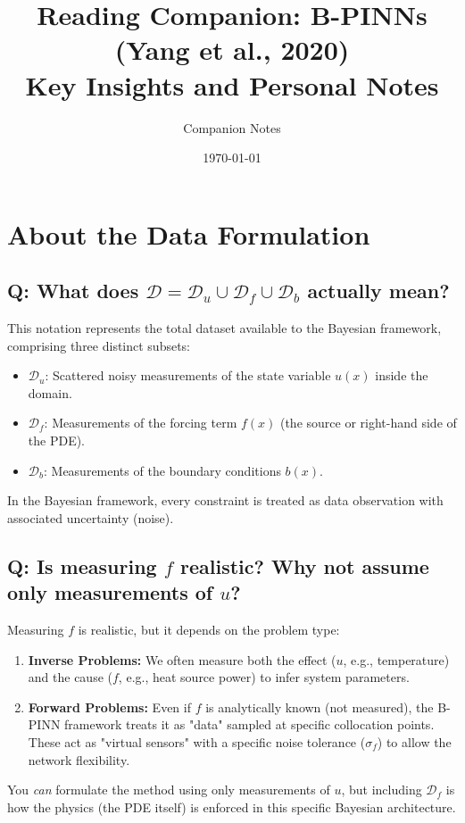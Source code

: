 \documentclass[11pt, a4paper]{article}
\title{\textbf{Reading Companion: B-PINNs (Yang et al., 2020)} \\ \large Key Insights and Personal Notes}
\author{Companion Notes}
\date{\today}
\begin{document}
\maketitle

\tableofcontents
\newpage

\section{About the Data Formulation}

\subsection*{Q: What does $\mathcal{D} = \mathcal{D}_u \cup \mathcal{D}_f \cup \mathcal{D}_b$ actually mean?}
This notation represents the total dataset available to the Bayesian framework, comprising three distinct subsets:
\begin{itemize}
    \item $\mathcal{D}_u$: Scattered noisy measurements of the state variable $u(x)$ inside the domain.
    \item $\mathcal{D}_f$: Measurements of the forcing term $f(x)$ (the source or right-hand side of the PDE).
    \item $\mathcal{D}_b$: Measurements of the boundary conditions $b(x)$.
\end{itemize}
In the Bayesian framework, every constraint is treated as data observation with associated uncertainty (noise).

\subsection*{Q: Is measuring $f$ realistic? Why not assume only measurements of $u$?}
Measuring $f$ is realistic, but it depends on the problem type:
\begin{enumerate}
    \item \textbf{Inverse Problems:} We often measure both the effect ($u$, e.g., temperature) and the cause ($f$, e.g., heat source power) to infer system parameters.
    \item \textbf{Forward Problems:} Even if $f$ is analytically known (not measured), the B-PINN framework treats it as "data" sampled at specific collocation points. These act as "virtual sensors" with a specific noise tolerance ($\sigma_f$) to allow the network flexibility.
\end{enumerate}
You \textit{can} formulate the method using only measurements of $u$, but including $\mathcal{D}_f$ is how the physics (the PDE itself) is enforced in this specific Bayesian architecture.
\end{document}
